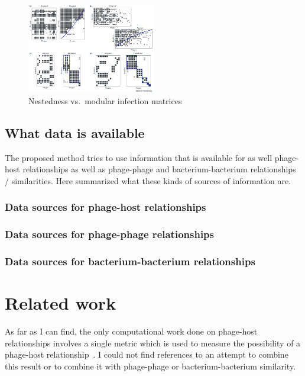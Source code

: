 \documentclass{article}
\begin{document}
\begin{figure}[h]
\centering
\includegraphics[width=0.5\textwidth]{img/nested-vs-modular.png}
\caption{Nestedness vs.\ modular infection matrices}
\end{figure}

\subsection{What data is available}

The proposed method tries to use information that is available for as well
phage-host relationships as well as phage-phage and bacterium-bacterium
relationships / similarities. Here summarized what these kinds of sources
of information are.

\subsubsection{Data sources for phage-host relationships}

\subsubsection{Data sources for phage-phage relationships}

\subsubsection{Data sources for bacterium-bacterium relationships}

\section{Related work}

As far as I can find, the only computational work done on phage-host relationships 
involves a single metric which is used to measure the possibility of a phage-host relationship~\cite{edwards2016computational}.
I could not find references to an attempt to combine this result or to combine
it with phage-phage or bacterium-bacterium similarity.
\end{document}
